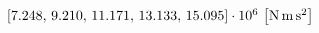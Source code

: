 $\left[7.248, \, 9.210, \, 11.171, \, 13.133, \, 15.095 \right] \cdot 10^6 \, \left[\si{\newton\meter\square\second}\right]$